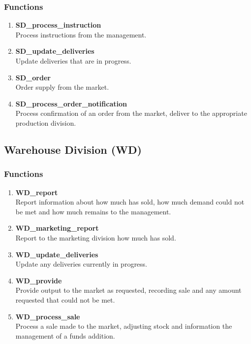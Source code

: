 \documentclass[11pt]{article}
\begin{document}
\subsubsection{Functions}
\begin{enumerate}
	\item \textbf{SD\_process\_instruction} \\
	Process instructions from the management.
	\item \textbf{SD\_update\_deliveries} \\
	Update deliveries that are in progress.
	\item \textbf{SD\_order} \\
	Order supply from the market.
	\item \textbf{SD\_process\_order\_notification} \\
	Process confirmation of an order from the market, deliver to the appropriate production division.
\end{enumerate}

\subsection{Warehouse Division (WD)}

\subsubsection{Functions}
\begin{enumerate}
	\item \textbf{WD\_report} \\
	Report information about how much has sold, how much demand could not be met and how much remains to the management.
	\item \textbf{WD\_marketing\_report} \\
	Report to the marketing division how much has sold.
	\item \textbf{WD\_update\_deliveries} \\
	Update any deliveries currently in progress.
	\item \textbf{WD\_provide} \\
	Provide output to the market as requested, recording sale and any amount requested that could not be met.
	\item \textbf{WD\_process\_sale} \\
	Process a sale made to the market, adjusting stock and information the management of a funds addition.
\end{enumerate}
\end{document}
